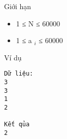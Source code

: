 Giới hạn
\begin{itemize}
	\item     1 ≤ N ≤ 60000   
	\item     1 ≤ a    $_     i    $    ≤ 60000   
\end{itemize}
Ví dụ
\begin{verbatim}
Dữ liệu:
3
3
1
2

Kết qủa
2
\end{verbatim}